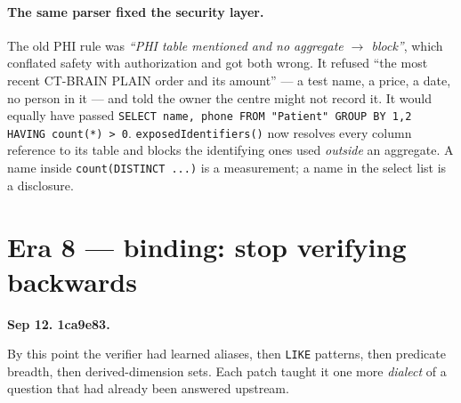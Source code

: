 \documentclass[11pt,a4paper]{report}
\newcommand{\code}[1]{\texttt{\small #1}}
\newcommand{\sha}[1]{{\ttfamily\small\color{slate}#1}}
\begin{document}
\paragraph{The same parser fixed the security layer.} The old PHI rule was
\emph{``PHI table mentioned and no aggregate $\to$ block''}, which conflated safety with
authorization and got both wrong. It refused ``the most recent CT-BRAIN PLAIN order and its
amount'' --- a test name, a price, a date, no person in it --- and told the owner the centre might
not record it. It would equally have passed
\code{SELECT name, phone FROM "Patient" GROUP BY 1,2 HAVING count(*) > 0}.
\code{exposedIdentifiers()} now resolves every column reference to its table and blocks the
identifying ones used \emph{outside} an aggregate. A name inside \code{count(DISTINCT ...)} is a
measurement; a name in the select list is a disclosure.

\section{Era 8 --- binding: stop verifying backwards}
\label{sec:era8}

\textbf{Sep 12. \sha{1ca9e83}.}

By this point the verifier had learned aliases, then \code{LIKE} patterns, then predicate breadth,
then derived-dimension sets. Each patch taught it one more \emph{dialect} of a question that had
already been answered upstream.
\end{document}
